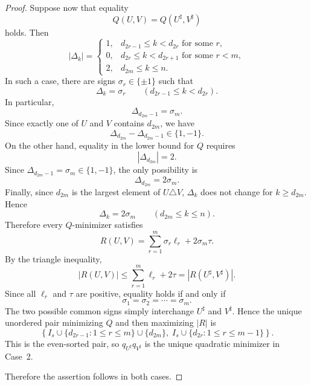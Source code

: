 \documentclass[10pt,a4paper]{amsart}
\begin{document}
\begin{proof}
Suppose now that equality 
\[
Q(U,V)=Q(U^\sharp,V^\sharp)
\]
holds.
Then 
\[
 |\Delta_k|=
 \begin{cases}
1, & d_{2r-1}\le k<d_{2r}
    \text{ for some }r,\\
0, & d_{2r}\le k<d_{2r+1}
    \text{ for some }r<m,\\
2, & d_{2m}\le k\le n.
 \end{cases}
\]
In such a case,
there are signs $\sigma_r\in\{\pm1\}$
such that
\[
 \Delta_k=\sigma_r
 \qquad
(d_{2r-1}\le k<d_{2r}).
\]
In particular,
$$
 \Delta_{d_{2m}-1}=\sigma_m.
$$
Since exactly one of \(U\) and \(V\) contains \(d_{2m}\), 
we have
$$
 \Delta_{d_{2m}}-\Delta_{d_{2m}-1}\in\{1,-1\}.
$$
On the other hand, equality in the lower bound for \(Q\) requires
$$
 |\Delta_{d_{2m}}|=2.
$$
Since \(\Delta_{d_{2m}-1}=\sigma_m\in\{1,-1\}\), the only possibility is
$$
 \Delta_{d_{2m}}=2\sigma_m.
$$
Finally, since \(d_{2m}\) is the largest element of \(U\triangle V\), \(\Delta_k\) does not change for \(k\ge d_{2m}\). Hence
$$
 \Delta_k=2\sigma_m
 \qquad
 (d_{2m}\le k\le n).
$$
Therefore every \(Q\)-minimizer satisfies
\[
R(U,V) =
 \sum_{r=1}^m\sigma_r\ell_r
+ 2\sigma_m\tau.
\]
By the triangle inequality,
\[
|R(U,V)|
 \le
 \sum_{r=1}^m\ell_r+2\tau
= |R(U^\sharp,V^\sharp)|.
\]
Since all \(\ell_r\) and \(\tau\) are positive, equality holds if and only if
\[
 \sigma_1=\sigma_2=\cdots=\sigma_m.
\]
The two possible common signs simply interchange
\(U^\sharp\) and \(V^\sharp\).
Hence the unique unordered pair minimizing $Q$ and then maximizing $|R|$ is
\[
 \left\{
 I_s\cup\{d_{2r-1}:1\le r\le m\}\cup\{d_{2m}\},
 \;
 I_s\cup\{d_{2r}:1\le r\le m-1\}
\right\}.
\]
This is the even-sorted pair, so $q_{U^\sharp}q_{V^\sharp}$ is the unique quadratic minimizer in Case~2.

\medskip

Therefore the assertion follows in both cases.
\end{proof}
\end{document}
